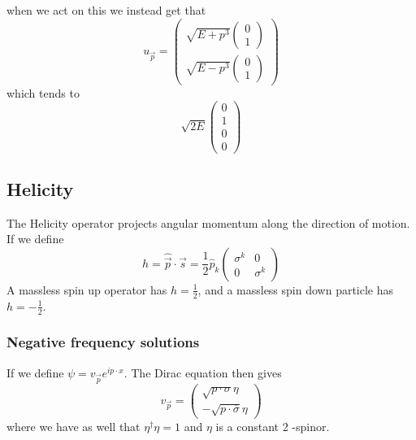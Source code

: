 when we act on this we instead get that 
\[
u _{ \vec{p} }  = \begin{pmatrix}  \sqrt{ E + p^ 3 }  \begin{pmatrix}  0 \\ 1   \end{pmatrix}  \\
\sqrt{ E - p ^ 3 }  \begin{pmatrix}  0 \\ 1  \end{pmatrix}  \end{pmatrix} 
\] which tends to 
\[
\sqrt{2 E }  \begin{pmatrix}  0 \\ 1 \\ 0 \\ 0  \end{pmatrix} 
\]
\subsection{Helicity}

The Helicity operator projects angular momentum 
along the direction of motion. 
If we define 
\[
h = \hat{\vec{p} } \cdot  \vec{s}  = \frac{1}{2 } \hat{ p } _ k 
\begin{pmatrix}  \sigma ^ k & 0 \\ 0 & \sigma ^ k  \end{pmatrix} 
\] A massless spin up operator has $ h = \frac{1}{2 } $, and a massless spin down 
particle has $ h = - \frac{1}{2 } $. 

\subsubsection{Negative frequency solutions} 
If we define $ \psi  = v _{ \vec{p} } e ^{ i p \cdot  x } $. 
The Dirac equation then gives 
\[
v_{ \vec{p} }  = \begin{pmatrix}  \sqrt{ p \cdot  \sigma }  \eta \\
- \sqrt{ p \cdot  \overline{ \sigma }  } \eta  \end{pmatrix} 
\] where we have as well that $ \eta ^ \dagger \eta  = 1 $ and $ \eta $ 
is a constant 2 -spinor. 

